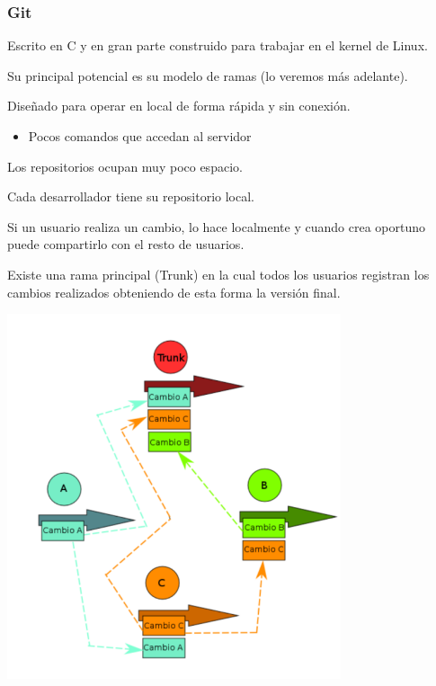 \subsubsection{Git}
Escrito en C y en gran parte construido para trabajar en el kernel de Linux.

Su principal potencial es su modelo de ramas (lo veremos más adelante).

Diseñado para operar en local de forma rápida y sin conexión.

\begin{itemize}
	\item Pocos comandos que accedan al servidor
\end{itemize}

Los repositorios ocupan muy poco espacio.

	Cada desarrollador tiene su repositorio local.
	
	Si un usuario realiza un cambio, lo hace localmente y cuando crea oportuno puede compartirlo con el resto de usuarios.
	
	Existe una rama principal (Trunk) en la cual todos los usuarios registran los cambios realizados obteniendo de esta forma la versión final.
\begin{center}
	\includegraphics{"Temas/Tema 1/screenshot004"}
\end{center}


